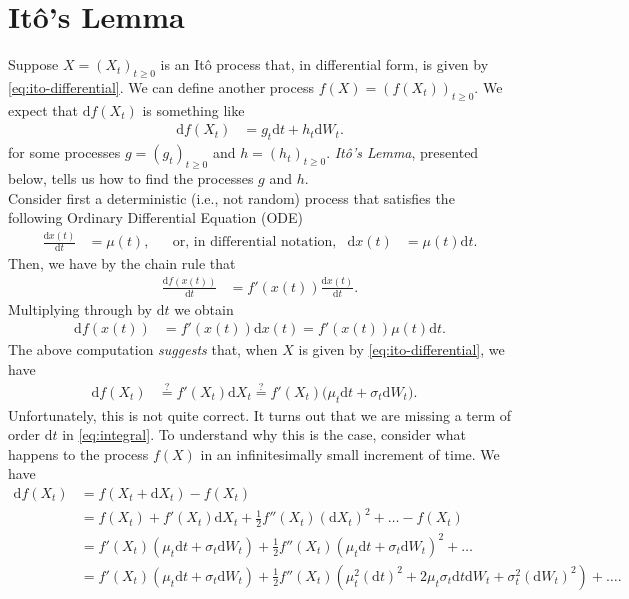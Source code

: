 \documentclass[12pt]{book}
\numberwithin{equation}{chapter}
\theoremstyle{plain}
\numberwithin{theorem}{section}
\theoremstyle{definition}
\numberwithin{exercise}{chapter}
\newcommand{\<}{\langle}
\renewcommand{\>}{\rangle}
\renewcommand{\(}{\left(}
\renewcommand{\)}{\right)}
\renewcommand{\[}{\left[}
\renewcommand{\]}{\right]}
\newcommand\sig{\sigma}
\newcommand\dd{\mathrm{d}}
\theoremstyle{definition}
\numberwithin{question}{section}
\begin{document}
\section{It\^o's Lemma}
Suppose $X=(X_t)_{t \geq 0}$ is an It\^o process that, in differential form, is given by \eqref{eq:ito-differential}.
We can define another process $f(X)=(f(X_t))_{t \geq 0}$.  
We expect that $\dd f(X_t)$ is something like
\begin{align}
\dd f(X_t) 
	&= g_t \dd t + h_t \dd W_t .
\end{align}
for some processes $g = (g_t)_{t \geq 0}$ and $h = (h_t)_{t \geq 0}$.  \textit{It\^o's Lemma}, presented below, tells us how to find the processes $g$ and $h$.
\\[0.5em]
Consider first a deterministic (i.e., not random) process that satisfies the following Ordinary Differential Equation (ODE)
\begin{align}
\frac{\dd x(t)}{\dd t}
	&=	\mu(t) , &
	&\text{or, in differential notation,}&
\dd x(t)
	&=	\mu(t) \dd t .
\end{align}
Then, we have by the
chain rule that
\begin{align}
\frac{\dd f(x(t))}{\dd t}
	&=	f'(x(t)) \frac{\dd x(t)}{\dd t} .
\end{align}
Multiplying through by $\dd t$ we obtain
\begin{align}
\dd f(x(t))  
	&=	f'(x(t)) \dd x(t)  
	 =	f'(x(t)) \mu(t) \dd t .
\end{align}
The above computation \textit{suggests} that, when $X$ is given by \eqref{eq:ito-differential}, we have
\begin{align}
\dd f(X_t) 
	&\stackrel{?}{=}	f'(X_t) \dd X_t 
	\stackrel{?}{=}	f'(X_t) \Big( \mu_t \dd t  + \sig_t \dd W_t \Big) . 
	& \label{eq:integral}
\end{align}
Unfortunately, this is not quite correct.  It turns out that we are missing a term of order $\dd t$ in \eqref{eq:integral}.  To understand why this is the case, consider what happens to the process $f(X)$ in an infinitesimally small increment of time.  We have
\begin{align}
\dd f(X_t)
	&= f(X_t + \dd X_t) - f(X_t) \\
	&= f(X_t) + f'(X_t) \dd X_t + \tfrac{1}{2} f''(X_t) (\dd X_t)^2 + \ldots - f(X_t) \\
	&= f'(X_t) ( \mu_t \dd t + \sig_t \dd W_t ) + \tfrac{1}{2} f''(X_t) ( \mu_t \dd t + \sig_t \dd W_t )^2 + \ldots \\
	&= f'(X_t) ( \mu_t \dd t + \sig_t \dd W_t ) + \tfrac{1}{2} f''(X_t) ( \mu_t^2 (\dd t)^2 + 2 \mu_t \sig_t \dd t \dd W_t + \sig_t^2 (\dd W_t)^2 ) + \ldots. \label{eq:df}
\end{align}
\end{document}
